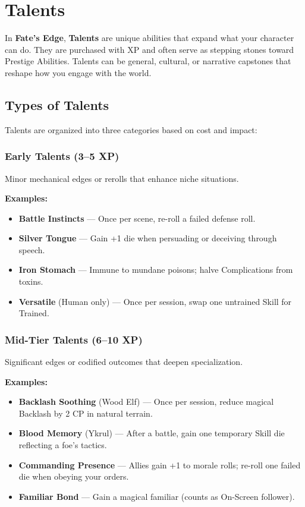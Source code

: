 
\chapter{Talents}

In \textbf{Fate’s Edge}, \textbf{Talents} are unique abilities that expand what your character can do. They are purchased with XP and often serve as stepping stones toward Prestige Abilities. Talents can be general, cultural, or narrative capstones that reshape how you engage with the world.

\section{Types of Talents}

Talents are organized into three categories based on cost and impact:

\subsection*{Early Talents (3–5 XP)}

Minor mechanical edges or rerolls that enhance niche situations.

\textbf{Examples:}
\begin{itemize}
  \item \textbf{Battle Instincts} — Once per scene, re-roll a failed defense roll.
  \item \textbf{Silver Tongue} — Gain +1 die when persuading or deceiving through speech.
  \item \textbf{Iron Stomach} — Immune to mundane poisons; halve Complications from toxins.
  \item \textbf{Versatile} (Human only) — Once per session, swap one untrained Skill for Trained.
\end{itemize}

\subsection*{Mid-Tier Talents (6–10 XP)}

Significant edges or codified outcomes that deepen specialization.

\textbf{Examples:}
\begin{itemize}
  \item \textbf{Backlash Soothing} (Wood Elf) — Once per session, reduce magical Backlash by 2 CP in natural terrain.
  \item \textbf{Blood Memory} (Ykrul) — After a battle, gain one temporary Skill die reflecting a foe’s tactics.
  \item \textbf{Commanding Presence} — Allies gain +1 to morale rolls; re-roll one failed die when obeying your orders.
  \item \textbf{Familiar Bond} — Gain a magical familiar (counts as On-Screen follower).
\end{itemize}

